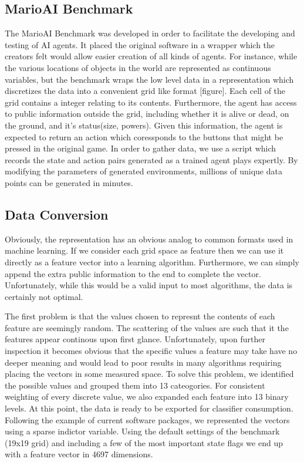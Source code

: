 \documentclass[]{article}   %
\begin{document}
\subsection{MarioAI Benchmark}
The MarioAI Benchmark \cite{mariobenchmark} was developed in order to facilitate the developing and testing of AI agents.  It placed the original software in a wrapper which the creators felt would allow easier creation of all kinds of agents.  For instance, while the various locations of objects in the world are represented as continuous variables, but the benchmark wraps the low level data in a representation which discretizes the data into a convenient grid like format [figure].  Each cell of the grid contains a integer relating to its contents.  Furthermore, the agent has access to public information outside the grid, including whether it is alive or dead, on the ground, and it's status(size, powers).  Given this information, the agent is expected to return an action which coressponds to the buttons that might be pressed in the original game.  In order to gather data, we use a script which records the state and action pairs generated as a trained agent \cite{me} plays expertly.  By modifying the parameters of generated environments, millions of unique data points can be generated in minutes.
\subsection{Data Conversion}
Obviously, the representation has an obvious analog to common formats used in machine learning.  If we consider each grid space as feature then we can use it directly as a feature vector into a learning algorithm.  Furthermore, we can simply append the extra public information to the end to complete the vector.  Unfortunately, while this would be a valid input to most algorithms, the data is certainly not optimal.

The first problem is that the values chosen to represnt the contents of each feature are seemingly random.  The scattering of the values are such that it the features appear continous upon first glance.  Unfortunately, upon further inspection it becomes obvious that the specific values a feature may take have no deeper meaning and would lead to poor results in many algorithms requiring placing the vectors in some measured space.  To solve this problem, we identified the possible values and grouped them into 13 cateogories.  For consistent weighting of every discrete value, we also expanded each feature into 13 binary levels.  At this point, the data is ready to be exported for classifier consumption.  Following the example of current software packages, we represented the vectors using a sparse indictor variable.  Using the default settings of the benchmark (19x19 grid) and including a few of the most important state flags we end up with a feature vector in 4697 dimensions.
\end{document}
